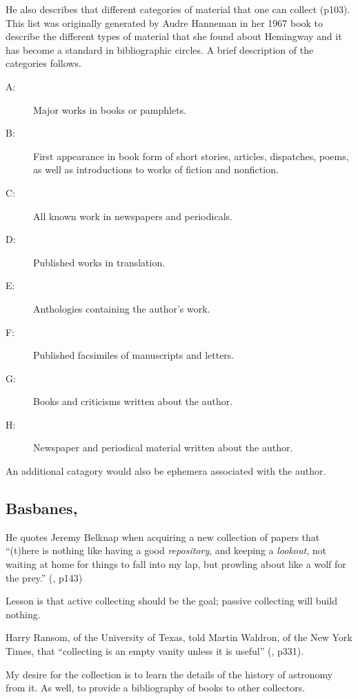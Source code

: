\documentclass[letterpaper]{article}
\begin{document}
He also describes that different categories of material that one can
collect (p103).  This list was originally generated by Audre Hanneman
in her 1967 book 
to describe the different types of material that she found about
Hemingway and it has become a standard in bibliographic circles.
A brief description of the categories follows.

\begin{description}
\item[A:] Major works in books or pamphlets.
\item[B:] First appearance in book form of short stories, articles,
  dispatches, poems, as well as introductions to works of fiction
  and nonfiction.
\item[C:] All known work in newspapers and periodicals.
\item[D:] Published works in translation.
\item[E:] Anthologies containing the author's work.
\item[F:] Published facsimiles of manuscripts and letters.
\item[G:] Books and criticisms written about the author.
\item[H:] Newspaper and periodical material written about the author.
\end{description}

An additional catagory would also be ephemera associated with
the author.

\subsection{Basbanes, }

He quotes Jeremy Belknap when acquiring a new collection of papers
that ``(t)here is nothing like having a good {\itshape repository},
and keeping a {\itshape lookout}, not waiting at home for things to
fall into my lap, but prowling about like a wolf for the prey.''
(\cite{Basbanes1999}, p143)

Lesson is that active collecting should be the goal; passive
collecting will build nothing.

Harry Ransom, of the University of Texas, told Martin Waldron, of
the New York Times, that ``collecting is an empty vanity unless
it is useful'' (\cite{Basbanes1999}, p331).

My desire for the collection is to learn the details of the history
of astronomy from it. As well, to provide a bibliography of books
to other collectors.
\end{document}
